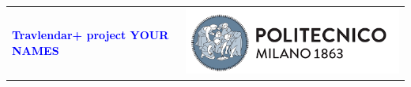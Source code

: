 




\begin{titlepage}



{\begin{table}[t!]
\centering
\begin{tabu} to \textwidth { X[1.3,r,p] X[1.7,l,p] }
\textcolor{Blue}
{\textbf{\small{Travlendar+ project YOUR NAMES}}} & \includegraphics[scale=0.5]{Images/PolimiLogo}
\end{tabu}
\end{table}}~\\ [7cm]


\begin{center}
\textcolor{myblue}{\textit{}}
\end{center}

\end{titlepage}





